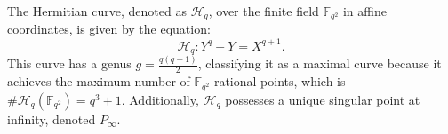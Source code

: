 \documentclass[a4paper]{amsart}
\theoremstyle{plain}
\theoremstyle{definition}
\theoremstyle{remark}
\begin{document}
%	
%	
%	
%	
%	
%	
%	
%	


The Hermitian curve, denoted as $\mathscr{H}_q$, over the finite field $\mathbb{F}_{q^2}$ in affine coordinates, is given by the equation:
\[
	\mathscr{H}_q: Y^q + Y = X^{q+1}.
\]
This curve has a genus $g = \frac{q(q-1)}{2}$, classifying it as a maximal curve because it achieves the maximum number of $\mathbb{F}_{q^2}$-rational points, which is $\#\mathscr{H}_q(\mathbb{F}_{q^2}) = q^3 + 1$. Additionally, $\mathscr{H}_q$ possesses a unique singular point at infinity, denoted $P_{\infty}$.
\end{document}
